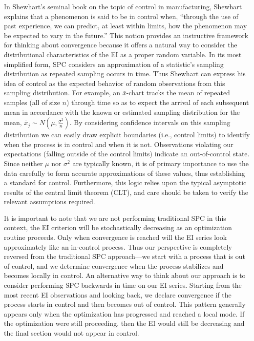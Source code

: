 \documentclass[12pt]{article}
\begin{document}
%
In Shewhart's seminal book \citep{shewhartBook} on the topic of control in manufacturing, Shewhart explains that a phenomenon is said to be in control when, ``through the use of past experience, we can predict, at least within limits, how the phenomenon may be expected to vary in the future.''
This notion provides an instructive framework for thinking about convergence because it offers a natural way to consider the distributional characteristics of the EI as a proper random variable. 
In its most simplified form, SPC considers an approximation of a statistic's sampling distribution as repeated sampling occurs in time.
Thus Shewhart can express his idea of control as the expected behavior of random observations from this sampling distribution.
For example, an $\bar x$-chart tracks the mean of repeated samples (all of size $n$) through time so as to expect the arrival of each subsequent mean in accordance with the known or estimated sampling distribution for the mean, $\bar{x}_j \sim N\left(\mu, \frac{\sigma^2}{n}\right)$.   
%
%
By considering confidence intervals on this sampling distribution we can easily draw explicit boundaries (i.e., control limits) to identify when the process is in control and when it is not.
%
Observations violating our expectations (falling outside of the control limits) indicate an out-of-control state.
%
Since neither $\mu$ nor $\sigma^2$ are typically known, it is of primary importance to use the data carefully to form accurate approximations of these values, thus establishing a standard for control.
%
Furthermore, this logic relies upon the typical asymptotic results of the central limit theorem (CLT), and care should be taken to verify the relevant assumptions required.


It is important to note that we are not performing traditional SPC in this context, the EI criterion will be stochastically decreasing as an optimization routine proceeds.  Only when convergence is reached will the EI series look approximately like an in-control process.  Thus our perspective is completely reversed from the traditional SPC approach---we start with a process that is out of control, and we determine convergence when the process stabilizes and becomes locally in control.  An alternative way to think about our approach is to consider performing SPC backwards in time on our EI series.  Starting from the most recent EI observations and looking back, we declare convergence if the process starts in control and then becomes out of control.  This pattern generally appears only when the optimization has progressed and reached a local mode.  If the optimization were still proceeding, then the EI would still be decreasing and the final section would not appear in control.
\end{document}
